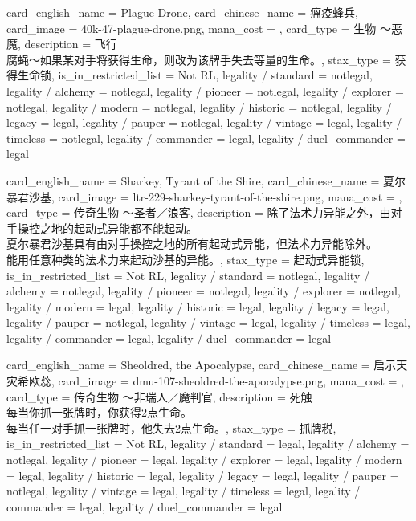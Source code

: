\documentclass[lang = cn, color = black, 10pt]{AllThatStax}
\begin{document}
\card
{
	card_english_name = {Plague Drone},
	card_chinese_name = {瘟疫蜂兵},
	card_image = 40k-47-plague-drone.png,
	mana_cost = ,
	card_type = 生物 ～恶魔,
	description = {飞行\\
		腐蝇～如果某对手将获得生命，则改为该牌手失去等量的生命。},
	stax_type = 获得生命锁,
	is_in_restricted_list = Not RL,
	legality / standard = notlegal,
	legality / alchemy = notlegal,
	legality / pioneer = notlegal,
	legality / explorer = notlegal,
	legality / modern = notlegal,
	legality / historic = notlegal,
	legality / legacy = legal,
	legality / pauper = notlegal,
	legality / vintage = legal,
	legality / timeless = notlegal,
	legality / commander = legal,
	legality / duel_commander = legal
}

\card
{
	card_english_name = {Sharkey, Tyrant of the Shire},
	card_chinese_name = {夏尔暴君沙基},
	card_image = ltr-229-sharkey-tyrant-of-the-shire.png,
	mana_cost = ,
	card_type = 传奇生物 ～圣者／浪客,
	description = {除了法术力异能之外，由对手操控之地的起动式异能都不能起动。\\
		夏尔暴君沙基具有由对手操控之地的所有起动式异能，但法术力异能除外。\\
		能用任意种类的法术力来起动沙基的异能。},
	stax_type = 起动式异能锁,
	is_in_restricted_list = Not RL,
	legality / standard = notlegal,
	legality / alchemy = notlegal,
	legality / pioneer = notlegal,
	legality / explorer = notlegal,
	legality / modern = legal,
	legality / historic = legal,
	legality / legacy = legal,
	legality / pauper = notlegal,
	legality / vintage = legal,
	legality / timeless = legal,
	legality / commander = legal,
	legality / duel_commander = legal
}

\card
{
	card_english_name = {Sheoldred, the Apocalypse},
	card_chinese_name = {启示天灾希欧蕊},
	card_image = dmu-107-sheoldred-the-apocalypse.png,
	mana_cost = ,
	card_type = 传奇生物 ～非瑞人／魔判官,
	description = {死触\\
		每当你抓一张牌时，你获得2点生命。\\
		每当任一对手抓一张牌时，他失去2点生命。},
	stax_type = 抓牌税,
	is_in_restricted_list = Not RL,
	legality / standard = legal,
	legality / alchemy = notlegal,
	legality / pioneer = legal,
	legality / explorer = legal,
	legality / modern = legal,
	legality / historic = legal,
	legality / legacy = legal,
	legality / pauper = notlegal,
	legality / vintage = legal,
	legality / timeless = legal,
	legality / commander = legal,
	legality / duel_commander = legal
}
\end{document}
